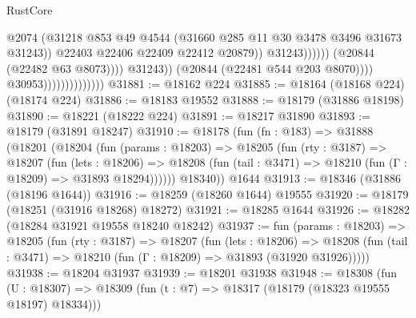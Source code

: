 \begin{lexlean}{RustCore}
\begin{coremodule}
                                                            @2074
                                                            (@31218
                                                              @853
                                                              @49
                                                              @4544
                                                              (@31660
                                                                @285
                                                                @11
                                                                @30
                                                                @3478
                                                                @3496
                                                                @31673
                                                                @31243))
                                                            @22403
                                                            @22406
                                                            @22409
                                                            @22412
                                                            @20879))
                                                        @31243))))))
                                            (@20844 (@22482 @63 @8073))))
                                        @31243))
                                    (@20844 (@22481 @544 @203 @8070))))
                                @30953))))))))))))))
@31881 := @18162 @224
@31885 := @18164 (@18168 @224) (@18174 @224)
@31886 := @18183 @19552
@31888 := @18179 (@31886 @18198)
@31890 := @18221 (@18222 @224)
@31891 := @18217 @31890
@31893 := @18179 (@31891 @18247)
@31910 := @18178
    (fun (fn : @183) =>
    @31888
      (@18201
        (@18204
          (fun (params : @18203) =>
          @18205
            (fun (rty : @3187) =>
            @18207
              (fun (lets : @18206) =>
              @18208 (fun (tail : @3471) => @18210 (fun (Γ : @18209) => @31893 @18294))))))
        @18340))
    @1644
@31913 := @18346 (@31886 (@18196 @1644))
@31916 := @18259 (@18260 @1644) @19555
@31920 := @18179 (@18251 (@31916 @18268) @18272)
@31921 := @18285 @1644
@31926 := @18282 (@18284 @31921 @19558 @18240 @18242)
@31937 := fun (params : @18203) =>
  @18205
    (fun (rty : @3187) =>
    @18207
      (fun (lets : @18206) =>
      @18208 (fun (tail : @3471) => @18210 (fun (Γ : @18209) => @31893 (@31920 @31926)))))
@31938 := @18204 @31937
@31939 := @18201 @31938
@31948 := @18308
    (fun (U : @18307) => @18309 (fun (t : @7) => @18317 (@18179 (@18323 @19555 @18197) @18334)))

\end{coremodule}
\end{lexlean}
